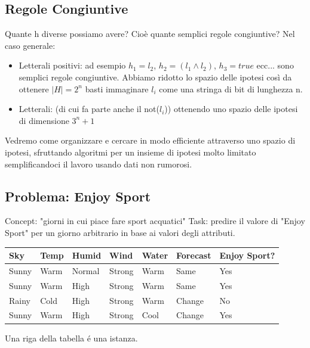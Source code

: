 \documentclass{article}
\begin{document}
\subsection{Regole Congiuntive}
Quante h diverse possiamo avere? Cioè quante semplici regole congiuntive? \newline
Nel caso generale:
\begin{itemize}
    \item Letterali positivi: ad esempio $h_1 = l_2$, $h_2=(l_1 \land l_2)$, $h_3 = true$ ecc... sono semplici regole congiuntive. Abbiamo ridotto lo spazio delle ipotesi così da ottenere $|H| = 2^n$ basti immaginare $l_i$ come una stringa di bit di lunghezza n.
    \item Letterali: (di cui fa parte anche il not($l_i$)) ottenendo uno spazio delle ipotesi di dimensione $3^n+1$
\end{itemize}
Vedremo come organizzare e cercare in modo efficiente attraverso uno spazio di ipotesi, sfruttando algoritmi per un insieme di ipotesi molto limitato semplificandoci il lavoro usando dati non rumorosi.

\subsection{Problema: Enjoy Sport}
Concept: "giorni in cui piace fare sport acquatici" \newline
Task: predire il valore di "Enjoy Sport" per un giorno arbitrario in base ai valori degli attributi.
\begin{table}[H]
\centering
\begin{tabular}{l|l|l|l|l|l|l}
Sky & Temp & Humid & Wind & Water & Forecast & Enjoy Sport? \\ \hline
Sunny & Warm & Normal & Strong & Warm & Same & Yes \\
Sunny & Warm & High & Strong & Warm & Same & Yes \\
Rainy & Cold & High & Strong & Warm & Change & No \\
Sunny & Warm & High & Strong & Cool & Change & Yes
\end{tabular}
\end{table}
Una riga della tabella é una istanza.
\end{document}
